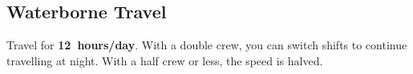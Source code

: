 \documentclass[itdr/core]{subfiles}
\begin{document}

\vspace{-1ex}

\subsection{Waterborne Travel}

Travel for \textbf{12~hours/day}. With a double crew, you can switch shifts to continue travelling at night. With a half crew or less, the speed is halved.
\end{document}
